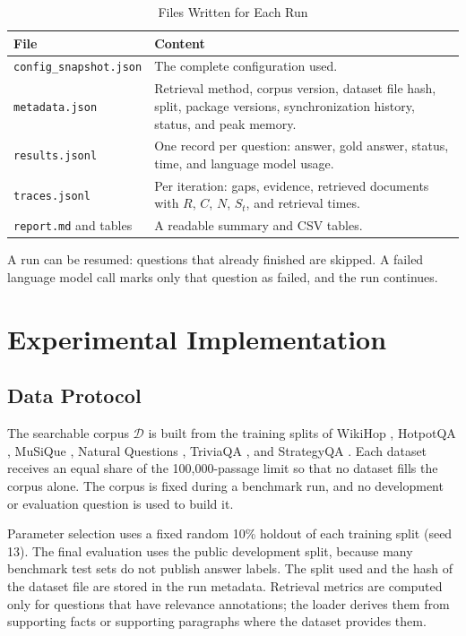 \documentclass[12pt,a4paper]{report}
\begin{document}
\begin{table}[H]
\centering
\caption{Files Written for Each Run}
\label{tab:impl-outputs}
\renewcommand{\arraystretch}{1.2}
\begin{tabular}{|p{1.9in}|p{4.15in}|}
\hline
\textbf{File} & \textbf{Content} \\ \hline
\texttt{config\_snapshot.json} & The complete configuration used. \\ \hline
\texttt{metadata.json} & Retrieval method, corpus version, dataset file hash, split, package versions, synchronization history, status, and peak memory. \\ \hline
\texttt{results.jsonl} & One record per question: answer, gold answer, status, time, and language model usage. \\ \hline
\texttt{traces.jsonl} & Per iteration: gaps, evidence, retrieved documents with $R$, $C$, $N$, $S_t$, and retrieval times. \\ \hline
\texttt{report.md} and tables & A readable summary and CSV tables. \\ \hline
\end{tabular}
\end{table}

A run can be resumed: questions that already finished are skipped. A failed language model call marks only that question as failed, and the run continues.

\section{Experimental Implementation}

\subsection{Data Protocol}

The searchable corpus $\mathcal{D}$ is built from the training splits of WikiHop \cite{welbl2018wikihop}, HotpotQA \cite{yang2018hotpotqa}, MuSiQue \cite{trivedi2022musique}, Natural Questions \cite{kwiatkowski2019natural}, TriviaQA \cite{joshi2017triviaqa}, and StrategyQA \cite{geva2021strategyqa}. Each dataset receives an equal share of the 100,000-passage limit so that no dataset fills the corpus alone. The corpus is fixed during a benchmark run, and no development or evaluation question is used to build it.

Parameter selection uses a fixed random 10\% holdout of each training split (seed 13). The final evaluation uses the public development split, because many benchmark test sets do not publish answer labels. The split used and the hash of the dataset file are stored in the run metadata. Retrieval metrics are computed only for questions that have relevance annotations; the loader derives them from supporting facts or supporting paragraphs where the dataset provides them.
\end{document}
